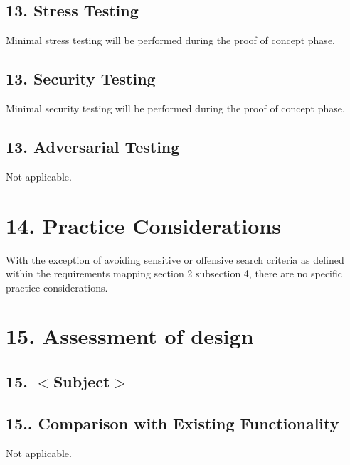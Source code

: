 \hypertarget{index_sec_13_3}{}\subsection{13.	\+Stress Testing}\label{index_sec_13_3}
\begin{DoxyVerb}Minimal stress testing will be performed during the proof of concept phase.
\end{DoxyVerb}
\hypertarget{index_sec_13_4}{}\subsection{13.	\+Security Testing}\label{index_sec_13_4}
\begin{DoxyVerb}Minimal security testing will be performed during the proof of concept phase.
\end{DoxyVerb}
\hypertarget{index_sec_13_5}{}\subsection{13.	\+Adversarial Testing}\label{index_sec_13_5}
\begin{DoxyVerb}Not applicable.
\end{DoxyVerb}
\hypertarget{index_sec_14}{}\section{14.	\+Practice Considerations}\label{index_sec_14}
\begin{DoxyVerb}With the exception of avoiding sensitive or offensive search criteria as defined within the 
requirements mapping section 2 subsection 4, there are no specific practice considerations.
\end{DoxyVerb}
\hypertarget{index_sec_15}{}\section{15.	\+Assessment of design}\label{index_sec_15}
\hypertarget{index_sec_15_1}{}\subsection{15.	$<$\+Subject$>$}\label{index_sec_15_1}
\hypertarget{index_sec_15_1_1}{}\subsection{15..	\+Comparison with Existing Functionality}\label{index_sec_15_1_1}
\begin{DoxyVerb}Not applicable.
\end{DoxyVerb}
